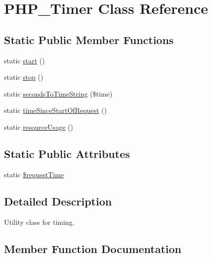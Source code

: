 \hypertarget{class_p_h_p___timer}{}\section{P\+H\+P\+\_\+\+Timer Class Reference}
\label{class_p_h_p___timer}
\subsection*{Static Public Member Functions}
\begin{DoxyCompactItemize}
\item 
static \mbox{\hyperlink{class_p_h_p___timer_a146085d0f3a9d17bdcd7f3d4081d8c0d}{start}} ()
\item 
static \mbox{\hyperlink{class_p_h_p___timer_a00c3c0c2fc53579e9d1ac28a52623450}{stop}} ()
\item 
static \mbox{\hyperlink{class_p_h_p___timer_a953a729d77565c65fae1c2db93bd7566}{seconds\+To\+Time\+String}} (\$time)
\item 
static \mbox{\hyperlink{class_p_h_p___timer_a47261cd60577fea5503d5994e45b6811}{time\+Since\+Start\+Of\+Request}} ()
\item 
static \mbox{\hyperlink{class_p_h_p___timer_a0497d98146ffede423c66e0c3dc401c8}{resource\+Usage}} ()
\end{DoxyCompactItemize}
\subsection*{Static Public Attributes}
\begin{DoxyCompactItemize}
\item 
static \mbox{\hyperlink{class_p_h_p___timer_a9d3accc7e7c5a7f4c3157df35cde6cfa}{\$request\+Time}}
\end{DoxyCompactItemize}


\subsection{Detailed Description}
Utility class for timing. 

\subsection{Member Function Documentation}
\mbox{\label{class_p_h_p___timer_a0497d98146ffede423c66e0c3dc401c8}} 
